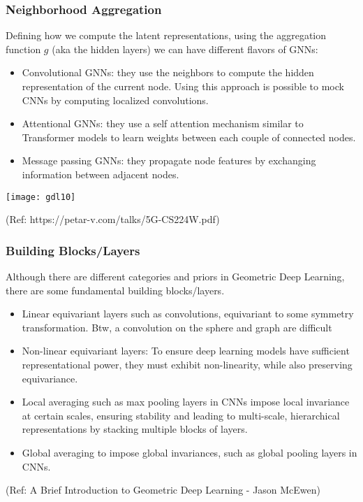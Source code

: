 \begin{frame}[fragile]\frametitle{Neighborhood Aggregation}

Defining how we compute the latent representations, using the aggregation function $g$ (aka the hidden layers) we can have different flavors of GNNs:

\begin{itemize}
\item Convolutional GNNs: they use the neighbors to compute the hidden representation of the current node. Using this approach is possible to mock CNNs by computing localized convolutions.
\item Attentional GNNs: they use a self attention mechanism similar to Transformer models to learn weights between each couple of connected nodes.
\item Message passing GNNs: they propagate node features by exchanging information between adjacent nodes.
\end{itemize}
	
\begin{center}
\texttt{[image: gdl10]}
\end{center}

{\tiny (Ref: https://petar-v.com/talks/5G-CS224W.pdf)}	

\end{frame}





\begin{frame}[fragile]\frametitle{Building Blocks/Layers}

Although there are different categories and priors in Geometric Deep Learning, there are some fundamental building blocks/layers.
\begin{itemize}
\item Linear equivariant layers such as convolutions, equivariant to some symmetry transformation. Btw, a convolution on the sphere and graph are difficult
\item Non-linear equivariant layers: To ensure deep learning models have sufficient representational power, they must exhibit non-linearity, while also preserving equivariance.
\item Local averaging such as max pooling layers in CNNs impose local invariance at certain scales, ensuring stability and leading to multi-scale, hierarchical representations by stacking multiple blocks of layers.
\item Global averaging to impose global invariances, such as global pooling layers in CNNs.
\end{itemize}


{\tiny (Ref: A Brief Introduction to Geometric Deep Learning - Jason McEwen)}

\end{frame}

